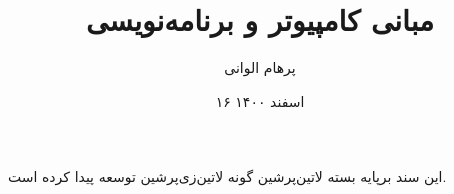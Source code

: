 \documentclass[]{article}
\title{مبانی کامپیوتر و برنامه‌نویسی}
\author{پرهام الوانی}
\date{۱۶ اسفند ۱۴۰۰}
\begin{document}
  \maketitle
  \tableofcontents
  \pagebreak

  
  
  
  
  

  \vspace*{\fill}
  \begin{center}
این سند برپایه بسته ‌لاتین{‌پرشین} گونه ‌لاتین{‌زی‌پرشین} توسعه پیدا کرده است.
  \end{center}
\end{document}
